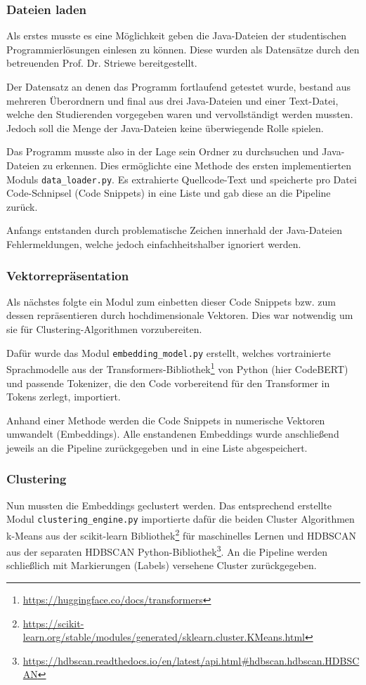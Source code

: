 \subsubsection*{Dateien laden}
Als erstes musste es eine Möglichkeit geben die Java-Dateien der studentischen Programmierlösungen einlesen zu können. Diese wurden als Datensätze durch den betreuenden Prof. Dr. Striewe bereitgestellt.

Der Datensatz an denen das Programm fortlaufend getestet wurde, bestand aus mehreren Überordnern und final aus drei Java-Dateien und einer Text-Datei, welche den Studierenden vorgegeben waren und vervollständigt werden mussten. Jedoch soll die Menge der Java-Dateien keine überwiegende Rolle spielen.

Das Programm musste also in der Lage sein Ordner zu durchsuchen und Java-Dateien zu erkennen. Dies ermöglichte eine Methode des ersten implementierten Moduls \texttt{data\_loader.py}. Es extrahierte Quellcode-Text und speicherte pro Datei Code-Schnipsel (Code Snippets) in eine Liste und gab diese an die Pipeline zurück.

Anfangs entstanden durch problematische Zeichen innerhald der Java-Dateien Fehlermeldungen, welche jedoch einfachheitshalber ignoriert werden.


\subsubsection*{Vektorrepräsentation}
Als nächstes folgte ein Modul zum einbetten dieser Code Snippets bzw. zum dessen repräsentieren durch hochdimensionale Vektoren. Dies war notwendig um sie für Clustering-Algorithmen vorzubereiten. 

Dafür wurde das Modul \texttt{embedding\_model.py} erstellt, welches vortrainierte Sprachmodelle aus der Transformers-Bibliothek\footnote{\url{https://huggingface.co/docs/transformers}} von Python (hier CodeBERT) und passende Tokenizer, die den Code vorbereitend für den Transformer in Tokens zerlegt, importiert.

Anhand einer Methode werden die Code Snippets in numerische Vektoren umwandelt (Embeddings). Alle enstandenen Embeddings wurde anschließend jeweils an die Pipeline zurückgegeben und in eine Liste abgespeichert.


\subsubsection*{Clustering}
Nun mussten die Embeddings geclustert werden. Das entsprechend erstellte Modul \texttt{clustering\_engine.py} importierte dafür die beiden Cluster Algorithmen k-Means aus der scikit-learn Bibliothek\footnote{\url{https://scikit-learn.org/stable/modules/generated/sklearn.cluster.KMeans.html}} für maschinelles Lernen und HDBSCAN aus der separaten HDBSCAN Python-Bibliothek\footnote{\url{https://hdbscan.readthedocs.io/en/latest/api.html\#hdbscan.hdbscan.HDBSCAN}}. An die Pipeline werden schließlich mit Markierungen (Labels) versehene Cluster zurückgegeben.


